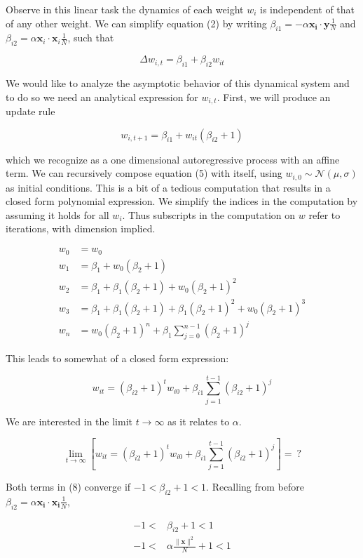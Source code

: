 \documentclass[]{article}
\begin{document}
Observe in this linear task the dynamics of each weight \(w_i\) is
independent of that of any other weight. We can simplify equation (2) by
writing \(\beta_ {i1}= - \alpha\mathbf{x_i}\cdot\mathbf{y}\frac{1}{N}\)
and \(\beta_{i2}=\alpha\mathbf{x}_i \cdot\mathbf{x}_i\frac{1}{N}\), such
that

\[
\Delta w_{i,t} = \beta_{i1}+\beta_{i2}w_{it}
\]

We would like to analyze the asymptotic behavior of this dynamical
system and to do so we need an analytical expression for \(w_{i,t}\).
First, we will produce an update rule

\[
w_{i,t+1} = \beta_{i1}+w_{it} (\beta_{i2}+1)
\]

which we recognize as a one dimensional autoregressive process with an
affine term. We can recursively compose equation (5) with itself, using
\(w_{i,0} \sim \mathcal{N}(\mu, \sigma)\) as initial conditions. This is
a bit of a tedious computation that results in a closed form polynomial
expression. We simplify the indices in the computation by assuming it
holds for all \(w_i\). Thus subscripts in the computation on \(w\) refer
to iterations, with dimension implied.

\begin{align}
w_{0} &= w_0\\
w_{1} &= \beta_1+w_0(\beta_2+1)  \\
w_2  &= \beta_1+\beta_1(\beta_2+1)+w_0(\beta_2+1)^2\\
w_3 &= \beta_1 + \beta_1(\beta_2+1)+\beta_1(\beta_2+1)^2+w_0(\beta_2+1)^3\\
w_n &=w_0(\beta_2 + 1)^n +  \beta_1\sum^{n-1}_{j=0}(\beta_2+1)^j
\end{align}

This leads to somewhat of a closed form expression:

\[
w_{it} = (\beta_{i2}+1)^t w_{i0}+\beta_{i1}\sum\limits^{t-1}_{j=1}(\beta_{i2}+1)^j
\]

We are interested in the limit \(t\to \infty\) as it relates to
\(\alpha\).

\[
\lim\limits_{t\to\infty} \left [w_{it} = (\beta_{i2}+1)^t w_{i0}+\beta_{i1}\sum\limits^{t-1}_{j=1}(\beta_{i2}+1)^j \right] =\ ?
\]

Both terms in (8) converge if \(-1 < \beta_{i2}+1 < 1\). Recalling from
before \(\beta_{i2} =\alpha\mathbf{x_i}\cdot\mathbf{x_i}\frac{1}{N}\),

\begin{align}
-1 < &\beta_{i2}+1  <1 \\
-1 < &\alpha\frac{\|\mathbf{x}\|^2}{N} + 1 < 1 \\
\end{align}
\end{document}

